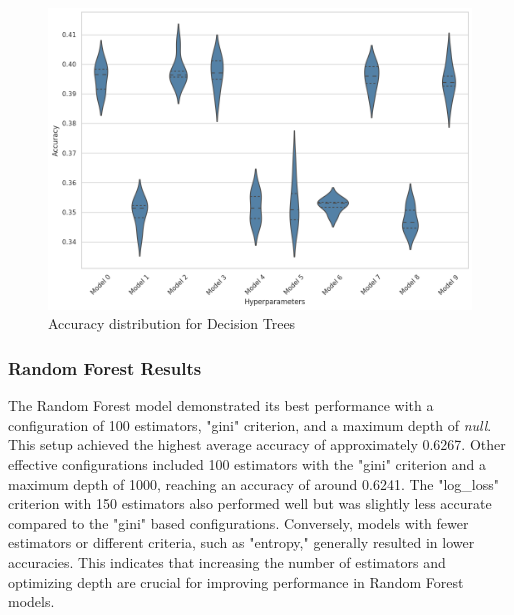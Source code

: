 \begin{figure}[H]
    \centering
    \includegraphics[width=0.99\columnwidth]{images/violin_plot_decision_tree.png}
    \caption{Accuracy distribution for Decision Trees}
    \label{fig:dt_violin_plot}
\end{figure}

\subsubsection{Random Forest Results}

The Random Forest model demonstrated its best performance 
with a configuration of 100 estimators, "gini" criterion, 
and a maximum depth of \textit{null}. 
This setup achieved the highest average accuracy of 
approximately 0.6267. 
Other effective configurations included 100 estimators 
with the "gini" criterion and a maximum depth of 1000, 
reaching an accuracy of around 0.6241. 
The "log\_loss" criterion with 150 estimators also 
performed well but was slightly less accurate compared 
to the "gini" based configurations. 
Conversely, models with fewer estimators or different 
criteria, such as "entropy," generally resulted 
in lower accuracies. This indicates that increasing 
the number of estimators and optimizing depth are 
crucial for improving performance in 
Random Forest models.

